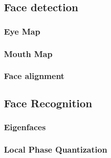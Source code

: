 \lipsum[10]
\subsection{Face detection}
\subsubsection{Eye Map}
\label{sub:FaceDetection}


\subsubsection{Mouth Map}


\subsubsection{Face alignment}


\subsection{Face Recognition}
\label{sub:FaceRecognition}


\subsubsection{Eigenfaces}
\label{subs:Eigenfaces}


\subsubsection{Local Phase Quantization}
\label{subs:LocalPhaseQuantization}

